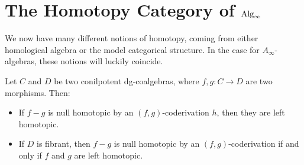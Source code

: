 \documentclass[../thesis.tex]{subfiles}
\begin{document}
    \section{The Homotopy Category of $\tt{Alg}_\infty$}

    We now have many different notions of homotopy, coming from either homological algebra or the model categorical structure. In the case for $A_\infty$-algebras, these notions will luckily coincide.

    \begin{proposition}\label{prop: homotopy-is-homotopy}
        Let $C$ and $D$ be two conilpotent dg-coalgebras, where $f,g: C \rightarrow D$ are two morphisms. Then:
        \begin{itemize}
            \item If $f-g$ is null homotopic by an $(f,g)$-coderivation $h$, then they are left homotopic.
            \item If $D$ is fibrant, then $f-g$ is null homotopic by an $(f,g)$-coderivation if and only if $f$ and $g$ are left homotopic.
        \end{itemize}
    \end{proposition}
\end{document}
